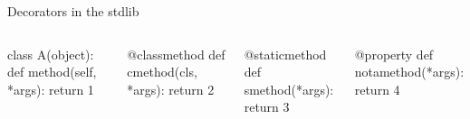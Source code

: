 \documentclass{beamer}
\begin{document}
\begin{frame}[fragile]{Decorators in the stdlib}
  \begin{columns}[t]
    \pause
    \begin{pycode}
    class A(object):
       def method(self, *args):
          return 1
    \end{pycode}
    \pause
    \begin{pycode}
       @classmethod
       def cmethod(cls, *args):
          return 2
    \end{pycode}
    \pause
    \begin{pycode}
       @staticmethod
       def smethod(*args):
          return 3
    \end{pycode}
    \pause
    \begin{pycode}
       @property
       def notamethod(*args):
          return 4
    \end{pycode}

  \end{columns}
\end{frame}
\end{document}
